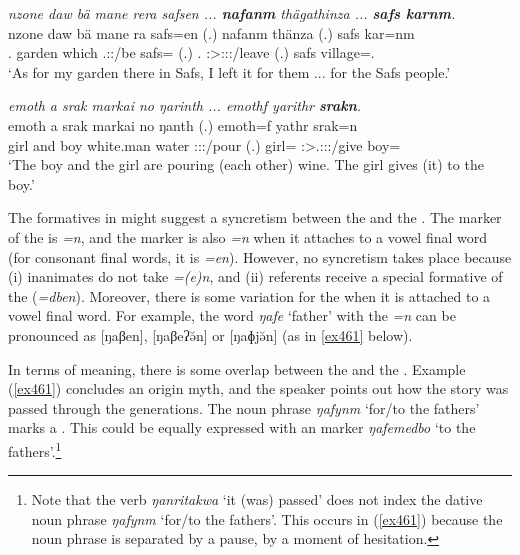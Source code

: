 \begin{exe}
	\ex \emph{nzone daw bä mane rera safsen ... \textbf{nafanm} thägathinza ... \textbf{safs karnm}.}\\
	\gll nzone daw bä mane ra safs=en (.) nafanm thänza (.) safs kar=nm\\
	\Fsg.\Poss{} garden \Med{} which \Tsg.\F:\Pst:\Ipfv/be safs=\Loc{} (.) \Tnsg.\Poss{} \Sg:\Sbj>\Stpl:\Io:\Pst:\Ipfv/leave (.) safs village=\Dat.\Nsg{}\\
	\trans `As for my garden there in Safs, I left it for them ... for the Safs people.'
	\label{ex460}
\end{exe}
\begin{exe}
	\ex \emph{emoth a srak markai no ŋarinth ... emothf yarithr \textbf{srakn}.}\\
	\gll emoth a srak markai no ŋanth (.) emoth=f yathr srak=n\\
	girl and boy {white.man} water \Stdu:\Sbj:\Nonpast:\Ipfv/pour (.) girl=\Erg{} \Stsg:\Sbj>\Tsg.\Masc:\Io:\Nonpast:\Ipfv/give boy=\Dat\\ 
	\trans `The boy and the girl are pouring (each other) wine. The girl gives (it) to the boy.'
	\label{ex462}
\end{exe}
	
The formatives in  might suggest a syncretism between the   and the  . The  marker of the  is \emph{=n}, and the  marker is also \emph{=n} when it attaches to a vowel final word (for consonant final words, it is \emph{=en}). However, no syncretism takes place because (i) inanimates do not take  \emph{=(e)n}, and (ii)  referents receive a special formative of the   (\emph{=dben}). Moreover, there is some variation for the  when it is attached to a vowel final word. For example, the word \emph{ŋafe} `father' with the  \emph{=n} can be pronounced as [ŋaβen], [ŋaβeʔə̆n] or [ŋaɸjə̆n] (as in \ref{ex461} below).%

In terms of meaning, there is some overlap between the  and the  . Example (\ref{ex461}) concludes an origin myth, and the speaker points out how the story was passed through the generations. The noun phrase \emph{ŋafynm} `for/to the fathers' marks a . This could be equally expressed with an   marker \emph{ŋafemedbo} `to the fathers'.\footnote{Note that the verb \emph{ŋanritakwa} `it (was) passed' does not index the dative noun phrase \emph{ŋafynm} `for/to the fathers'. This occurs in (\ref{ex461}) because the noun phrase is separated by a pause, by a moment of hesitation.}

